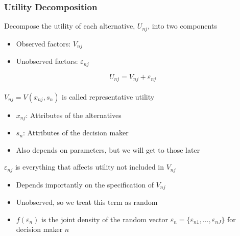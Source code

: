 \documentclass{beamer}\usepackage[]{graphicx}\usepackage[]{color}
\begin{document}
\begin{frame}\frametitle{Utility Decomposition}
	Decompose the utility of each alternative, $U_{nj}$, into two components
	\begin{itemize}
		\item Observed factors: $V_{nj}$
		\item Unobserved factors: $\varepsilon_{nj}$
	\end{itemize}
	$$U_{nj} = V_{nj} + \varepsilon_{nj}$$ \\
	\vspace{2ex}
	$V_{nj} = V(x_{nj}, s_n)$ is called representative utility
	\begin{itemize}
		\item $x_{nj}$: Attributes of the alternatives
		\item $s_n$: Attributes of the decision maker
		\item Also depends on parameters, but we will get to those later
	\end{itemize}
	\vspace{2ex}
	$\varepsilon_{nj}$ is everything that affects utility not included in $V_{nj}$
	\begin{itemize}
		\item Depends importantly on the specification of $V_{nj}$
		\item Unobserved, so we treat this term as random
		\item $f(\varepsilon_n)$ is the joint density of the random vector $\varepsilon_n = \{\varepsilon_{n1}, \dots, \varepsilon_{nJ}\}$ for decision maker $n$
	\end{itemize}
\end{frame}
\end{document}
